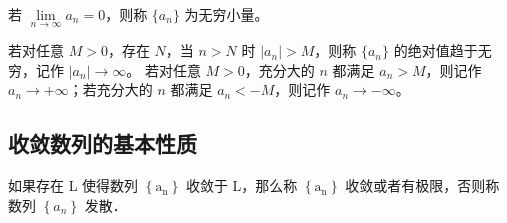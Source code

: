 \documentclass[fontset=fandol]{ctexart}
\newenvironment{custom}[1]{\par\noindent\textbf{#1}\quad}{\par\vspace{0.8em}}
\newenvironment{remark}{\par\noindent\textbf{注}\quad}{\par\vspace{0.8em}}
\begin{document}
\begin{definition}[无穷小量]
	若 \(\lim\limits_{n\to\infty} a_n = 0\)，则称 \(\{a_n\}\) 为无穷小量。
\end{definition}

\begin{definition}[无穷大量]
	若对任意 \(M>0\)，存在 \(N\)，当 \(n>N\) 时 \(|a_n|>M\)，则称 \(\{a_n\}\) 的绝对值趋于无穷，记作 \(|a_n|\to\infty\)。
	若对任意 \(M>0\)，充分大的 \(n\) 都满足 \(a_n>M\)，则记作 \(a_n\to+\infty\)；若充分大的 \(n\) 都满足 \(a_n<-M\)，则记作 \(a_n\to-\infty\)。
\end{definition}

\subsection{收敛数列的基本性质}

\begin{proposition}[数列的收敛与发散]
如果存在 L 使得数列 $\left\{\mathrm{a}_{\mathrm{n}}\right\}$ 收敛于 L，那么称 $\left\{\mathrm{a}_{\mathrm{n}}\right\}$ 收敛或者有极限，否则称数列 $\left\{a_n\right\}$ 发散．
	
\end{proposition}
\end{document}
